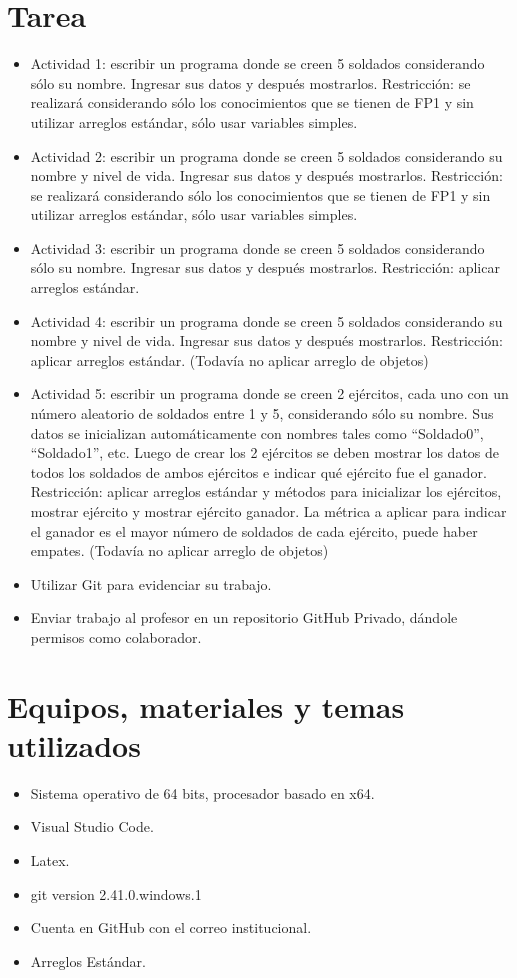 \documentclass{article}
\begin{document}
	\section{Tarea}
	\begin{itemize}		
		\item Actividad 1: escribir un programa donde se creen 5 soldados considerando sólo su nombre. Ingresar sus datos y
		después mostrarlos.
		Restricción: se realizará considerando sólo los conocimientos que se tienen de FP1 y sin utilizar arreglos estándar,
		sólo usar variables simples.
		\item Actividad 2: escribir un programa donde se creen 5 soldados considerando su nombre y nivel de vida. Ingresar sus
		datos y después mostrarlos.
		Restricción: se realizará considerando sólo los conocimientos que se tienen de FP1 y sin utilizar arreglos estándar,
		sólo usar variables simples.
		\item Actividad 3: escribir un programa donde se creen 5 soldados considerando sólo su nombre. Ingresar sus datos y
		después mostrarlos.
		Restricción: aplicar arreglos estándar.
		\item Actividad 4: escribir un programa donde se creen 5 soldados considerando su nombre y nivel de vida. Ingresar sus
		datos y después mostrarlos.
		Restricción: aplicar arreglos estándar. (Todavía no aplicar arreglo de objetos)
		\item Actividad 5: escribir un programa donde se creen 2 ejércitos, cada uno con un número aleatorio de soldados entre
		1 y 5, considerando sólo su nombre. Sus datos se inicializan automáticamente con nombres tales como “Soldado0”,
		“Soldado1”, etc. Luego de crear los 2 ejércitos se deben mostrar los datos de todos los soldados de ambos ejércitos
		e indicar qué ejército fue el ganador.
		Restricción: aplicar arreglos estándar y métodos para inicializar los ejércitos, mostrar ejército y mostrar ejército
		ganador. La métrica a aplicar para indicar el ganador es el mayor número de soldados de cada ejército, puede
		haber empates. (Todavía no aplicar arreglo de objetos)
		\item Utilizar Git para evidenciar su trabajo.
		\item Enviar trabajo al profesor en un repositorio GitHub Privado, dándole permisos como colaborador.
	\end{itemize}
		
	\section{Equipos, materiales y temas utilizados}
	\begin{itemize}
		\item Sistema operativo de 64 bits, procesador basado en x64.
		\item Visual Studio Code.
		\item Latex. 
		\item git version 2.41.0.windows.1
		\item Cuenta en GitHub con el correo institucional.
		\item Arreglos Estándar.	
	\end{itemize}
	
\end{document}
